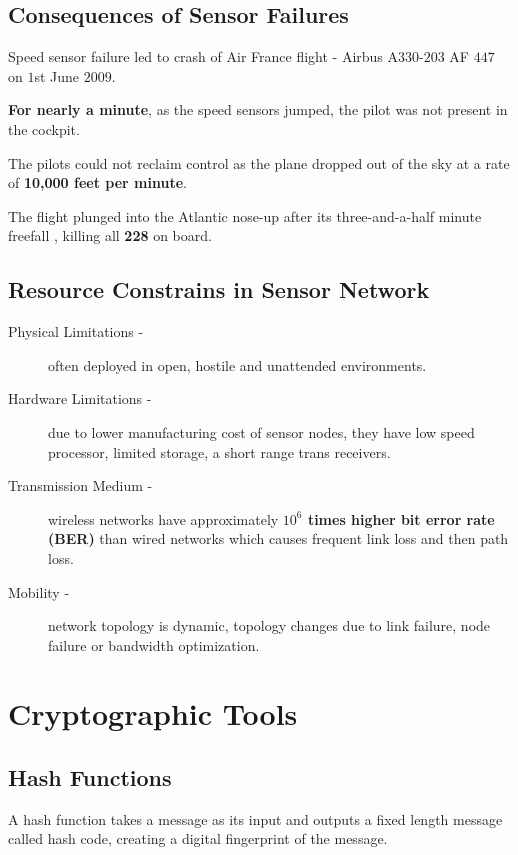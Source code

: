 \documentclass[%
  slidesonly,%
  semlayer%
  ]{seminar}                                  %
\begin{document}
\begin{slide}
  \subsection*{Consequences of Sensor Failures}
      \vfill
      Speed sensor failure led to crash of Air France flight - Airbus A$330$-$203$ AF $447$ on $1$st June $2009$.
      
      \textbf{For nearly a minute}, as the speed sensors jumped, the pilot was not present in the cockpit. 

      The pilots could not reclaim control as the plane dropped out of the sky at a rate of \textbf{10,000 feet per minute}.
          
      The flight plunged into the Atlantic nose-up after its three-and-a-half minute freefall , killing all \textbf{228} on board.      
      \vfill
      \clearpage

  \subsection*{Resource Constrains in Sensor Network}
    \vfill
    \begin{description}
      \item[Physical Limitations -] often deployed in open, hostile and unattended environments.

      \item[Hardware Limitations -] due to lower manufacturing cost of sensor nodes, they have low speed processor, limited storage, a short range trans receivers.

      \item[Transmission Medium -] wireless networks have approximately \textbf{$10^6$ times higher bit error rate (BER)} than wired networks which causes frequent link loss and then path loss.

      \item[Mobility -] network topology is dynamic, topology changes due to link failure, node failure or bandwidth optimization.
    \end{description}
    \vfill
    \clearpage

\section*{Cryptographic Tools}
  \vfill
  \subsection*{Hash Functions}
    A hash function takes a message as its input and outputs a fixed length message called hash code, creating a digital fingerprint of the message.


\end{slide}
\end{document}
